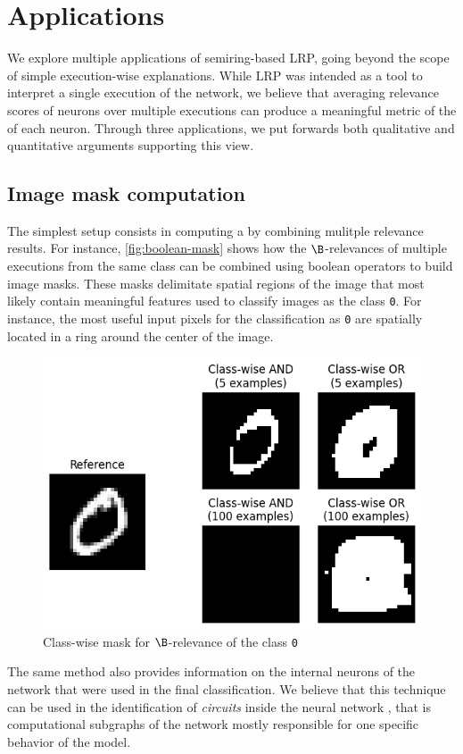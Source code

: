 \documentclass[twocolumn]{../cs-classes/cs-classes}
\newcommand*{\1}{\digitsbb{1}}
\newcommand*{\0}{\digitsbb{0}}
\begin{document}
\section{Applications}
We explore multiple applications of semiring-based LRP, going beyond the scope of simple execution-wise explanations. While LRP was intended as a tool to interpret a single execution of the network, we believe that averaging relevance scores of neurons over multiple executions can produce a meaningful metric of the  of each neuron. Through three applications, we put forwards both qualitative and quantitative arguments supporting this view.

\subsection{Image mask computation}
The simplest setup consists in computing a  by combining mulitple relevance results. For instance, \autoref{fig:boolean-mask} shows how the $\B$-relevances of multiple executions from the same class can be combined using boolean operators to build image masks. These masks delimitate spatial regions of the image that most likely contain meaningful features used to classify images as the class \texttt{0}. For instance, the most useful input pixels for the classification as \texttt{0} are spatially located in a ring around the center of the image.
\begin{figure}[H]
    \centering
    \includegraphics[width=.9\linewidth]{boolean-mask.png}
    \caption{Class-wise mask for $\B$-relevance of the class \texttt{0}}
    \label{fig:boolean-mask}
\end{figure}
The same method also provides information on the internal neurons of the network that were used in the final classification. We believe that this technique can be used in the identification of \emph{circuits} inside the neural network \cite{circuits}, that is computational subgraphs of the network mostly responsible for one specific behavior of the model.
\end{document}
